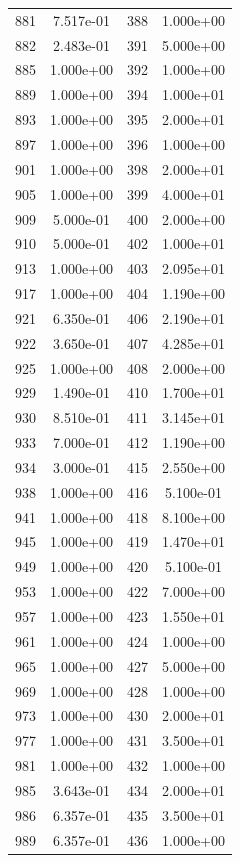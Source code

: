 \documentclass[12pt]{article}
\begin{document}
\begin{longtable}{@{}cccc@{}}
881 & 7.517e-01 & 388 & 1.000e+00 \\
882 & 2.483e-01 & 391 & 5.000e+00 \\
885 & 1.000e+00 & 392 & 1.000e+00 \\
889 & 1.000e+00 & 394 & 1.000e+01 \\
893 & 1.000e+00 & 395 & 2.000e+01 \\
897 & 1.000e+00 & 396 & 1.000e+00 \\
901 & 1.000e+00 & 398 & 2.000e+01 \\
905 & 1.000e+00 & 399 & 4.000e+01 \\
909 & 5.000e-01 & 400 & 2.000e+00 \\
910 & 5.000e-01 & 402 & 1.000e+01 \\
913 & 1.000e+00 & 403 & 2.095e+01 \\
917 & 1.000e+00 & 404 & 1.190e+00 \\
921 & 6.350e-01 & 406 & 2.190e+01 \\
922 & 3.650e-01 & 407 & 4.285e+01 \\
925 & 1.000e+00 & 408 & 2.000e+00 \\
929 & 1.490e-01 & 410 & 1.700e+01 \\
930 & 8.510e-01 & 411 & 3.145e+01 \\
933 & 7.000e-01 & 412 & 1.190e+00 \\
934 & 3.000e-01 & 415 & 2.550e+00 \\
938 & 1.000e+00 & 416 & 5.100e-01 \\
941 & 1.000e+00 & 418 & 8.100e+00 \\
945 & 1.000e+00 & 419 & 1.470e+01 \\
949 & 1.000e+00 & 420 & 5.100e-01 \\
953 & 1.000e+00 & 422 & 7.000e+00 \\
957 & 1.000e+00 & 423 & 1.550e+01 \\
961 & 1.000e+00 & 424 & 1.000e+00 \\
965 & 1.000e+00 & 427 & 5.000e+00 \\
969 & 1.000e+00 & 428 & 1.000e+00 \\
973 & 1.000e+00 & 430 & 2.000e+01 \\
977 & 1.000e+00 & 431 & 3.500e+01 \\
981 & 1.000e+00 & 432 & 1.000e+00 \\
985 & 3.643e-01 & 434 & 2.000e+01 \\
986 & 6.357e-01 & 435 & 3.500e+01 \\
989 & 6.357e-01 & 436 & 1.000e+00 \\

\end{longtable}
\end{document}
